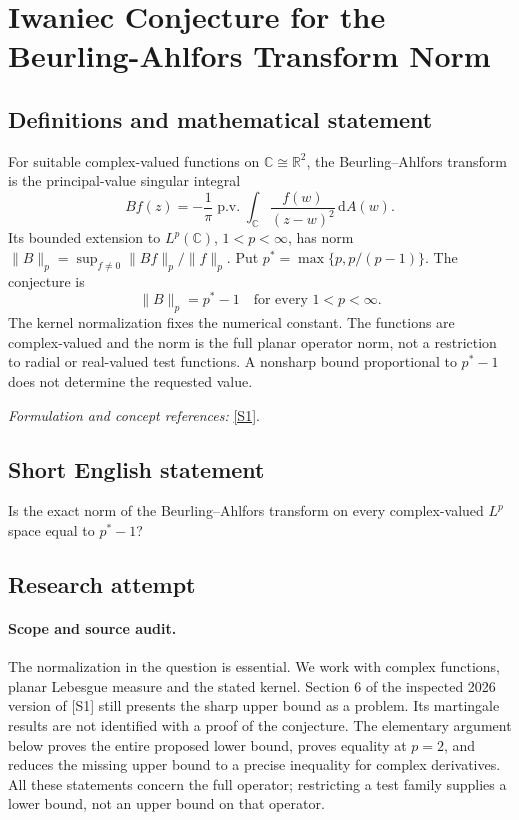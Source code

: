 \documentclass[11pt]{article}
\begin{document}
\section*{\texorpdfstring{Iwaniec Conjecture for the Beurling-Ahlfors Transform Norm}{Iwaniec Conjecture for the Beurling-Ahlfors Transform Norm}}\label{statement}
\subsection{Definitions and mathematical statement}
For suitable complex-valued functions on ${\mathbb{C}}\cong{\mathbb{R}}^2$, the Beurling--Ahlfors transform is the principal-value singular integral
\[
 Bf(z)=-\frac1\pi\operatorname{p.v.}\int_{{\mathbb{C}}}
 \frac{f(w)}{(z-w)^2}{\,\mathrm{d}} A(w).
\]
Its bounded extension to $L^p({\mathbb{C}})$, $1<p<\infty$, has norm $\|B\|_p=\sup_{f\ne0}\|Bf\|_p/\|f\|_p$. Put $p^*=\max\{p,p/(p-1)\}$. The conjecture is
\[
 \|B\|_p=p^*-1\quad\text{for every }1<p<\infty.
\]
The kernel normalization fixes the numerical constant. The functions are complex-valued and the norm is the full planar operator norm, not a restriction to radial or real-valued test functions. A nonsharp bound proportional to $p^*-1$ does not determine the requested value.
\par\smallskip\textit{Formulation and concept references:} \href{https://arxiv.org/html/2604.09365v2#S6}{[S1]}.

\subsection{Short English statement}
Is the exact norm of the Beurling--Ahlfors transform on every complex-valued $L^p$ space equal to $p^*-1$?
\subsection{Research attempt}
\paragraph{Scope and source audit.}
The normalization in the question is essential. We work with complex
functions, planar Lebesgue measure and the stated kernel. Section 6 of
the inspected 2026 version of [S1] still presents the sharp upper
bound as a problem. Its martingale results are not identified with a
proof of the conjecture. The elementary argument below proves the
entire proposed lower bound, proves equality at $p=2$, and reduces
the missing upper bound to a precise inequality for complex derivatives.
All these statements concern the full operator; restricting a test
family supplies a lower bound, not an upper bound on that operator.
\end{document}
